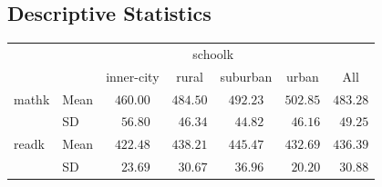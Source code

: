 \documentclass[doc]{apa6}\usepackage[]{graphicx}\usepackage[]{color}
\begin{document}
\clearpage
\begin{landscape}
\section{Descriptive Statistics}

\begin{tabular}{llccccc}
\hline
& & \multicolumn{4}{c}{schoolk} & \multicolumn{1}{c}{} \\ 
 &  & inner-city & rural & suburban & urban & \multicolumn{1}{c}{All} \\ 
\hline
mathk & Mean  & $460.00$ & $484.50$ & $492.23$ & $502.85$ & $483.28$ \\
 & SD  & $\phantom{0}56.80$ & $\phantom{0}46.34$ & $\phantom{0}44.82$ & $\phantom{0}46.16$ & $\phantom{0}49.25$ \\
readk & Mean  & $422.48$ & $438.21$ & $445.47$ & $432.69$ & $436.39$ \\
 & SD  & $\phantom{0}23.69$ & $\phantom{0}30.67$ & $\phantom{0}36.96$ & $\phantom{0}20.20$ & $\phantom{0}30.88$ \\
\hline 
\end{tabular}



\end{landscape}
\end{document}
